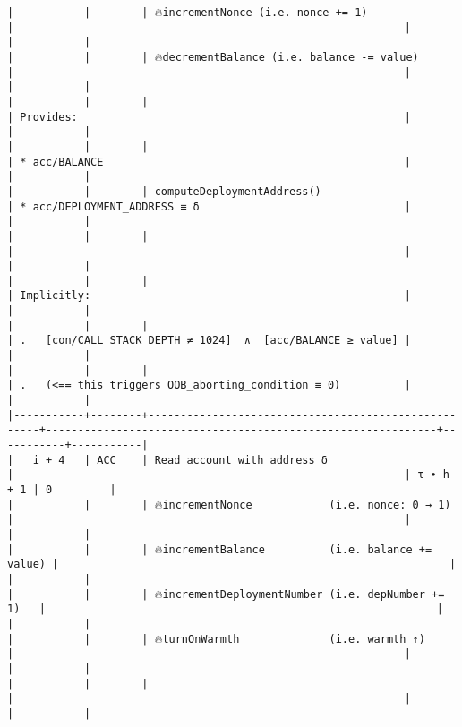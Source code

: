 \documentclass[varwidth=\maxdimen,margin=0.5cm,multi={verbatim}]{standalone}
\begin{document}
\begin{verbatim}
|           |        | 🔥incrementNonce (i.e. nonce += 1)                  |                                                             |           |           |
|           |        | 🔥decrementBalance (i.e. balance -= value)          |                                                             |           |           |
|           |        |                                                     | Provides:                                                   |           |           |
|           |        |                                                     | * acc/BALANCE                                               |           |           |
|           |        | computeDeploymentAddress()                          | * acc/DEPLOYMENT_ADDRESS ≡ δ                                |           |           |
|           |        |                                                     |                                                             |           |           |
|           |        |                                                     | Implicitly:                                                 |           |           |
|           |        |                                                     | .   [con/CALL_STACK_DEPTH ≠ 1024]  ∧  [acc/BALANCE ≥ value] |           |           |
|           |        |                                                     | .   (<== this triggers OOB_aborting_condition ≡ 0)          |           |           |
|-----------+--------+-----------------------------------------------------+-------------------------------------------------------------+-----------+-----------|
|   i + 4   | ACC    | Read account with address δ                         |                                                             | τ ∙ h + 1 | 0         |
|           |        | 🔥incrementNonce            (i.e. nonce: 0 → 1)     |                                                             |           |           |
|           |        | 🔥incrementBalance          (i.e. balance += value) |                                                             |           |           |
|           |        | 🔥incrementDeploymentNumber (i.e. depNumber += 1)   |                                                             |           |           |
|           |        | 🔥turnOnWarmth              (i.e. warmth ↑)         |                                                             |           |           |
|           |        |                                                     |                                                             |           |           |

\end{verbatim}
\end{document}
